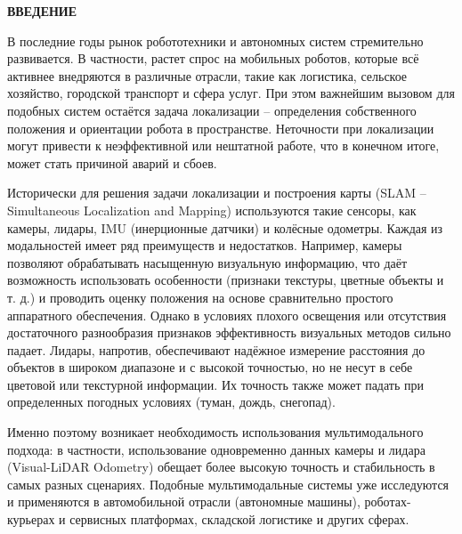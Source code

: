 





\newpage
\renewcommand{\contentsname}{\centerline{\large СОДЕРЖАНИЕ}}
\tableofcontents

\newpage
\begin{center}
  \textbf{\large ВВЕДЕНИЕ}
\end{center}

В последние годы рынок робототехники и автономных систем стремительно развивается. В частности, растет спрос на мобильных роботов, 
которые всё активнее внедряются в различные отрасли, такие как логистика, сельское хозяйство, городской транспорт и сфера услуг. 
При этом важнейшим вызовом для подобных систем остаётся задача локализации – определения собственного положения и ориентации робота в пространстве. 
Неточности при локализации могут привести к неэффективной или нештатной работе, что в конечном итоге, может стать причиной аварий и сбоев.

Исторически для решения задачи локализации и построения карты (SLAM – Simultaneous Localization and Mapping) используются такие сенсоры, 
как камеры, лидары, IMU (инерционные датчики) и колёсные одометры. Каждая из модальностей имеет ряд преимуществ и недостатков. Например, 
камеры позволяют обрабатывать насыщенную визуальную информацию, что даёт возможность использовать особенности (признаки текстуры, цветные объекты и т. д.) 
и проводить оценку положения на основе сравнительно простого аппаратного обеспечения. Однако в условиях плохого освещения или отсутствия достаточного 
разнообразия признаков эффективность визуальных методов сильно падает. Лидары, напротив, обеспечивают надёжное измерение расстояния 
до объектов в широком диапазоне и с высокой точностью, но не несут в себе цветовой или текстурной информации. Их точность также может падать при определенных погодных условиях (туман, дождь, снегопад).

Именно поэтому возникает необходимость использования мультимодального подхода: в частности, использование одновременно данных камеры и лидара (Visual-LiDAR Odometry) 
обещает более высокую точность и стабильность в самых разных сценариях. Подобные мультимодальные системы уже исследуются и применяются в автомобильной 
отрасли (автономные машины), роботах-курьерах и сервисных платформах, складской логистике и других сферах.


